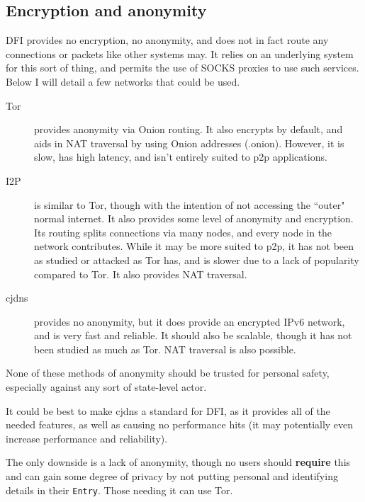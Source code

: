 \subsection{Encryption and anonymity}
\begin{multicols}{2}
	DFI provides no encryption, no anonymity, and does not in fact route any
	connections or packets like other systems may. It relies on an underlying
	system for this sort of thing, and permits the use of SOCKS proxies to use
	such services. Below I will detail a few networks that could be used.

	\begin{description}
		\item[Tor] \cite{tor} provides anonymity via Onion routing. It also encrypts by
			default, and aids in NAT traversal by using Onion addresses
			(.onion). However, it is slow, has high latency, and isn't entirely
			suited to p2p applications. 
		\item[I2P] \cite{i2p} is similar to Tor, though with the intention of not
			accessing the ``outer" normal internet. It also provides some level
			of anonymity and encryption. Its routing splits connections via 
			many nodes, and every node in the network contributes. While it may 
			be more suited to p2p, it has not been as studied or attacked as 
			Tor has, and is slower due to a lack of popularity compared to Tor.
			It also provides NAT traversal.
		\item[cjdns] \cite{cjdns} provides no anonymity, but it does provide an encrypted
			IPv6 network, and is very fast and reliable. It should also be
			scalable, though it has not been studied as much as Tor. NAT
			traversal is also possible.
	\end{description} 

	None of these methods of anonymity should be trusted for personal safety, especially
	against any sort of state-level actor.

	It could be best to make cjdns a standard for DFI, as it provides all of the
	needed features, as well as causing no performance hits (it may potentially
	even increase performance and reliability).

	The only downside is a lack of anonymity, though no users should \textbf{require}
	this and can gain some degree of privacy by not putting personal and
	identifying details in their \texttt{Entry}. Those needing it can use Tor.
\end{multicols}
